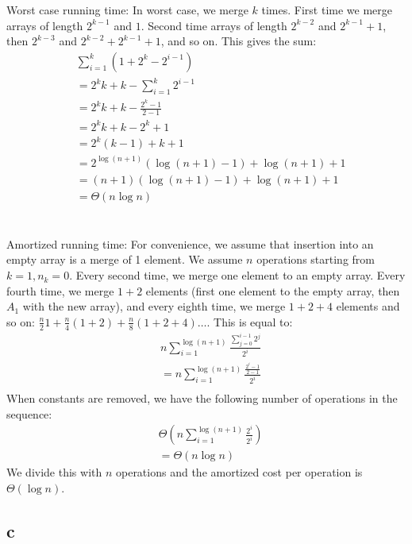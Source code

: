 \documentclass[koma,a4paper]{article}
\begin{document}
Worst case running time: In worst case, we merge $k$ times. First time we merge arrays of length $2^{k-1}$ and $1$. Second time arrays of length $2^{k-2}$ and $2^{k-1}+1$, then $2^{k-3}$ and $2^{k-2}+2^{k-1}+1$, and so on. This gives the sum:
\begin{align*}
&\sum_{i=1}^{k}(1+2^k-2^{i-1})\\
&= 2^kk+k - \sum_{i=1}^{k} 2^{i-1}\\
&=2^kk+k-\frac{2^k-1}{2-1}\\
&=2^kk+k-2^k+1\\
&=2^k(k-1)+k+1\\
&=2^{\log(n+1)}(\log(n+1)-1)+\log(n+1)+1\\
&=(n+1)(\log(n+1)-1)+\log(n+1)+1\\
&=\Theta\left(n\log n\right)
\end{align*}
\\\\
Amortized running time: For convenience, we assume that insertion into an empty array is a merge of 1 element. We assume $n$ operations starting from $k=1, n_k=0$. Every second time, we merge one element to an empty array. Every fourth time, we merge $1+2$ elements (first one element to the empty array, then $A_1$ with the new array), and every eighth time, we merge $1+2+4$ elements and so on: $\frac{n}{2}1+\frac{n}{4}(1+2)+\frac{n}{8}(1+2+4) \ldots$. This is equal to:
\begin{align*}
  &n \sum_{i=1}^{\log(n+1)} \frac{\sum_{j=0}^{i-1}2^j}{2^i}\\
  &=n \sum_{i=1}^{\log(n+1)} \frac{\frac{2^i-1}{2-1}}{2^i}\\
\end{align*}
When constants are removed, we have the following number of operations in the sequence:
\begin{align*}
  &\Theta\left(n \sum_{i=1}^{\log(n+1)} \frac{2^i}{2^i}\right)\\
  &=\Theta\left(n \log n\right)
\end{align*}
We divide this with $n$ operations and the amortized cost per operation is $\Theta\left(\log n\right)$.

\subsection{c}
\end{document}
